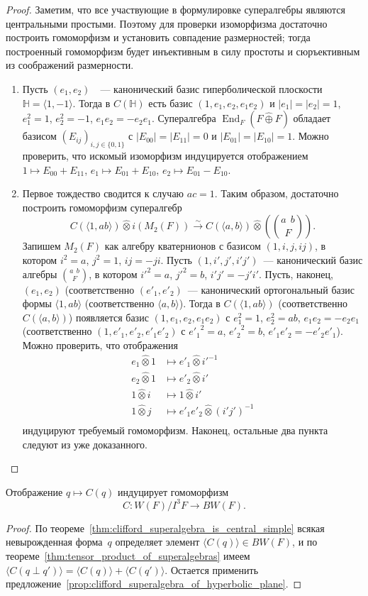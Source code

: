 \documentclass[a4paper,oneside,12pt]{article}
\theoremstyle{plain} { \swapnumbers
\newtheorem{theorem}{Теорема}[subsection]
\newtheorem{corollary}[theorem]{Следствие}
\newtheorem{lemma}[theorem]{Лемма}
\newtheorem{proposition}[theorem]{Утверждение}
\newtheorem{claim}[theorem]{Факт}
}
\theoremstyle{definition} { \swapnumbers
\newtheorem{definition}[theorem]{Определение}
\newtheorem{notation}[theorem]{Обозначение}
\newtheorem{remark}[theorem]{Замечание}
\newtheorem{remarks}[theorem]{Замечания}
\newtheorem{example}[theorem]{Пример}
\newtheorem{examples}[theorem]{Примеры}
\newtheorem{sssection}[theorem]{}
}
\def\End{\operatorname{End}}
\def\la{\langle}
\def\ra{\rangle}
\def\quaternion#1#2#3{\binom{{#1}\:\:{#2}}{#3}}
\begin{document}
\begin{proof}
Заметим, что все участвующие в формулировке супералгебры являются центральными простыми. Поэтому для проверки изоморфизма
достаточно построить гомоморфизм и установить совпадение размерностей; тогда построенный гомоморфизм будет инъективным
в силу простоты и сюръективным из соображений размерности.
\begin{enumerate}
\item Пусть $(e_1,e_2)$~~--- канонический базис гиперболической плоскости
$\mathbb H=\la 1,-1\ra$. Тогда в $C(\mathbb H)$ есть базис
$(1,e_1,e_2,e_1e_2)$ и $|e_1|=|e_2|=1$, $e_1^2=1$, $e_2^2=-1$, $e_1e_2=-e_2e_1$.
Супералгебра $\End_F(F\hat\oplus F)$ обладает базисом $(E_{ij})_{i,j\in\{0,1\}}$ с $|E_{00}|=|E_{11}|=0$
и $|E_{01}|=|E_{10}|=1$. Можно проверить, что искомый изоморфизм индуцируется отображением
$1\mapsto E_{00}+E_{11}$, $e_1\mapsto E_{01}+E_{10}$, $e_2\mapsto E_{01}-E_{10}$.
\item Первое тождество сводится к случаю $ac=1$. Таким образом, достаточно построить гомоморфизм супералгебр
$$
C(\la 1,ab\ra)\hat\otimes i(M_2(F))\stackrel{\sim}\longrightarrow C(\la a,b\ra)\hat\otimes\left(\quaternion{a}{b}{F}\right).
$$
Запишем $M_2(F)$ как алгебру кватернионов с базисом $(1,i,j,ij)$, в котором $i^2=a$, $j^2=1$, $ij=-ji$. Пусть
$(1,i',j',i'j')$~--- канонический базис алгебры $\quaternion{a}{b}{F}$, в котором $i'^2=a$, $j'^2=b$, $i'j'=-j'i'$.
Пусть, наконец, $(e_1,e_2)$ (соответственно $(e'_1,e'_2)$~--- канонический ортогональный базис формы $\la 1,ab\ra$
(соответственно $\la a,b\ra$). Тогда в $C(\la 1,ab\ra)$ (соответственно $C(\la a,b\ra)$) появляется базис
$(1,e_1,e_2,e_1e_2)$ с $e_1^2=1$, $e_2^2=ab$, $e_1e_2=-e_2e_1$ (соответственно 
$(1,e'_1,e'_2,e'_1e'_2)$ с ${e'_1}^2=a$, ${e'_2}^2=b$, $e'_1e'_2=-e'_2e'_1$).
Можно проверить, что отображения
$$
\begin{aligned}
e_1\hat\otimes 1&\mapsto e'_1\hat\otimes i'^{-1}\\
e_2\hat\otimes 1&\mapsto e'_2\hat\otimes i'\\
1\hat\otimes i&\mapsto 1\hat\otimes i'\\
1\hat\otimes j&\mapsto e'_1e'_2\hat\otimes (i'j')^{-1}\\
\end{aligned}
$$
индуцируют требуемый гомоморфизм. Наконец, остальные два пункта следуют из уже доказанного.
\end{enumerate}
\end{proof}

\begin{corollary}\label{corollary:C_homo}
Отображение $q\mapsto C(q)$ индуцирует гомоморфизм
$$
C\colon W(F)/I^3F\to BW(F).
$$
\end{corollary}
\begin{proof}
По теореме~\ref{thm:clifford_superalgebra_is_central_simple} всякая невырожденная форма~$q$
определяет элемент $\la C(q)\ra\in BW(F)$, и по теореме~\ref{thm:tensor_product_of_superalgebras}
имеем $\la C(q\perp q')\ra=\la C(q)\ra + \la C(q')\ra$. Остается применить
предложение~\ref{prop:clifford_superalgebra_of_hyperbolic_plane}.
\end{proof}
\end{document}
